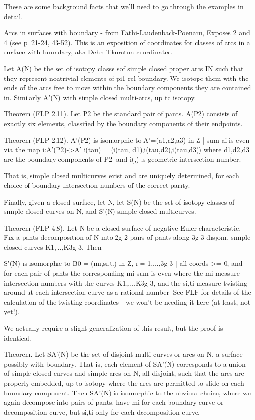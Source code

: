 \documentclass[12pt]{amsart}
\theoremstyle{definition}
\begin{document}
These are some background facts that we'll need to go through the examples in
detail.

Arcs in surfaces with boundary - from Fathi-Laudenback-Poenaru, Exposes 2 and
4 (see p. 21-24, 43-52).
This is an exposition of coordinates for classes of arcs in a surface
with boundary, aka Dehn-Thurston coordinates.

Let A(N) be the set of isotopy classe sof simple closed proper arcs I\in N such
that they represent nontrivial elements of pi1 rel boundary. We isotope them
with the ends of the arcs free to move within the boundary components they are
contained in. Similarly A'(N) with simple closed multi-arcs, up to isotopy.

Theorem (FLP 2.11). Let P2 be the standard pair of pants. A(P2) consists of
exactly six elements, classified by the boundary components of their endpoints.

Theorem (FLP 2.12). A'(P2) is isomorphic to
A'={(a1,a2,a3) in Z | sum ai is even }
via the map
i:A'(P2)->A'
i(tau) = (i(tau, d1),i(tau,d2),i(tau,d3)) where d1,d2,d3 are the boundary
components of P2, and i(,) is geometric intersection number.

That is, simple closed multicurves exist and are uniquely determined, for each
choice of boundary intersection numbers of the correct parity.

Finally, given a closed surface, let N, let S(N) be the set of isotopy classes
of simple closed curves on N, and S'(N) simple closed multicurves.

Theorem (FLP 4.8). Let N be a closed surface of negative Euler characteristic.
Fix a pants decomposition of N into 2g-2 pairs of pants along 3g-3 disjoint
simple closed curves K1,...,K3g-3. Then

S'(N) is isomorphic to B0 = {(mi,si,ti) in Z, i = 1,...,3g-3 | all coords >= 0,
and for each pair of pants the corresponding mi sum is even}
where the mi measure intersection numbers with the curves K1,...,K3g-3, and the
si,ti measure twisting around at each intersection curve as a rational number.
See FLP for details of the calculation of the twisting coordinates - we won't
be needing it here (at least, not yet!).

We actually require a slight generalization of this result, but the proof is
identical.

Theorem. Let SA'(N) be the set of disjoint multi-curves or arcs on N, a surface
possibly with boundary. That is, each element of SA'(N) corresponds to a union
of simple closed curves and simple arcs on N, all disjoint, such that the arcs
are properly embedded, up to isotopy where the arcs are permitted to slide on
each boundary component. Then SA'(N) is isomorphic to the obvious choice, where
we again decompose into pairs of pants, have mi for each boundary curve or
decomposition curve, but si,ti only for each decomposition curve.
\end{document}
